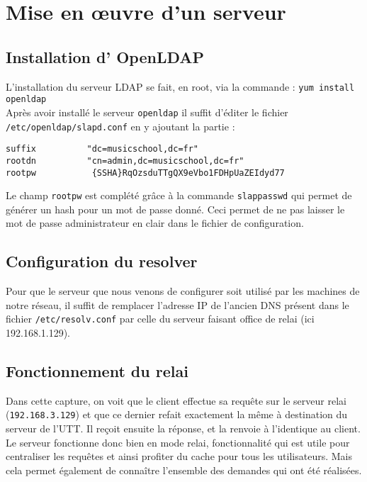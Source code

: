 \documentclass[12pt,a4paper,notitlepage]{article}
\begin{document}
\clearpage
\section{Mise en \oe uvre d'un serveur}
\subsection{Installation d' OpenLDAP}

L'installation du serveur LDAP se fait, en root, via la commande : \texttt{yum install openldap}\\

Après avoir installé le serveur \texttt{openldap} il suffit d'éditer le fichier \texttt{/etc/openldap/slapd.conf} en y ajoutant la partie : 

\begin{lstlisting}[title=Contenu du fichier slapd.conf]
suffix          "dc=musicschool,dc=fr"
rootdn          "cn=admin,dc=musicschool,dc=fr"
rootpw           {SSHA}RqOzsduTTgQX9eVbo1FDHpUaZEIdyd77

\end{lstlisting}

Le champ  \texttt{rootpw} est complété grâce à la commande \texttt{slappasswd} qui permet de générer un hash pour un mot de passe donné. Ceci permet de ne pas laisser le mot de passe administrateur en clair dans le fichier de configuration.\\


\subsection{Configuration du resolver}
Pour que le serveur que nous venons de configurer soit utilisé par les machines de notre réseau, il suffit de remplacer l'adresse IP de l'ancien DNS présent dans le fichier \texttt{/etc/resolv.conf} par celle du serveur faisant office de relai (ici 192.168.1.129). 

\subsection{Fonctionnement du relai}


Dans cette capture, on voit que le client effectue sa requête sur le serveur relai (\texttt{192.168.3.129}) et que ce dernier refait exactement la même à destination du serveur de l'UTT. Il reçoit ensuite la réponse, et la renvoie à l'identique au client. Le serveur fonctionne donc bien en mode relai, fonctionnalité qui est utile pour centraliser les requêtes et ainsi profiter du cache pour tous les utilisateurs. Mais cela permet également de connaître l'ensemble des demandes qui ont été réalisées.
\end{document}
